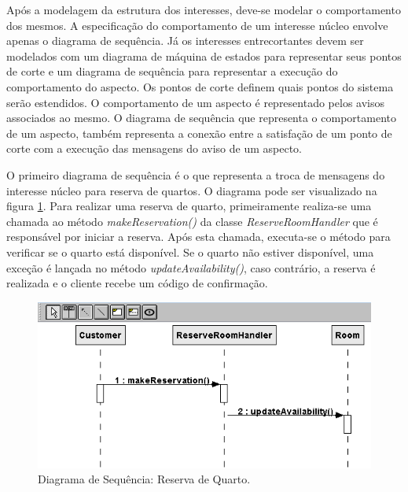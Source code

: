 Após a modelagem da estrutura dos interesses, deve-se modelar o comportamento dos mesmos. A especificação do comportamento de um interesse núcleo
envolve apenas o diagrama de sequência. Já os interesses entrecortantes devem ser modelados com um diagrama de máquina de estados para representar
seus pontos de corte e um diagrama de sequência para representar a execução do comportamento do aspecto. Os pontos de corte definem quais pontos do
sistema serão estendidos. O comportamento de um aspecto é representado pelos avisos associados ao mesmo. O diagrama de sequência que representa o
comportamento de um aspecto, também representa a conexão entre a satisfação de um ponto de corte com a execução das mensagens do aviso de um aspecto.

O primeiro diagrama de sequência é o que representa a troca de mensagens do interesse núcleo para reserva de quartos. O diagrama pode ser visualizado
na figura \ref{fig:case_study_behavioral_reserve_room}. Para realizar uma reserva de quarto, primeiramente realiza-se uma chamada ao método
\textit{makeReservation()} da classe \textit{ReserveRoomHandler} que é responsável por iniciar a reserva. Após esta chamada, executa-se o método
para verificar se o quarto está disponível. Se o quarto não estiver disponível, uma exceção é lançada no método \textit{updateAvailability()}, caso
contrário, a reserva é realizada e o cliente recebe um código de confirmação.

  \begin{figure}[!b]
	\centering
	\includegraphics{img/case_study_behavioral_reserve_room.png}
	\caption{Diagrama de Sequência: Reserva de Quarto.}\label{fig:case_study_behavioral_reserve_room}
  \end{figure}
  
